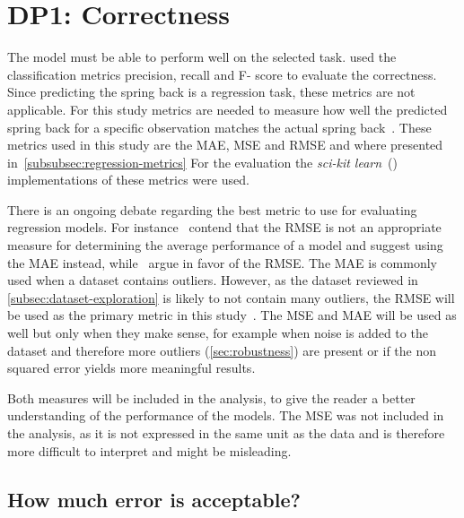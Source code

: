 \section{DP1: Correctness}\label{sec:dp1:-correctness}

The model must be able to perform well on the selected task.
\cite{siebert2022construction} used the classification metrics precision, recall and F- score to evaluate the
correctness.
Since predicting the spring back is a regression task, these metrics are not applicable.
For this study metrics are needed to measure how well the predicted spring back for a specific observation
matches the actual spring back~\cite[p. 29]{hastie2009elements}.
These metrics used in this study are the MAE, MSE and RMSE and where presented in~\cref{subsubsec:regression-metrics}
For the evaluation the \textit{sci-kit learn}~(\cite{scikit-learn}) implementations of these metrics were used.

There is an ongoing debate regarding the best metric to use for evaluating regression models.
For instance~\cite{willmott2005advantages} contend that the RMSE is not an appropriate measure for determining the
average performance of a model and suggest using the MAE instead, while~\cite{chai2014root} argue in favor of the RMSE.
The MAE is commonly used when a dataset contains outliers.
However, as the dataset reviewed in \cref{subsec:dataset-exploration} is likely to not contain many outliers, the
RMSE will be used as the primary metric in this study~\cite[p. 1249]{chai2014root}.
The MSE and MAE will be used as well but only when they make sense, for example when noise is added to the dataset
and therefore more outliers (\cref{sec:robustness}) are present or if the non squared error yields more meaningful
results.

Both measures will be included in the analysis, to give the reader a better understanding of the performance of
the models.
The MSE was not included in the analysis, as it is not expressed in the same unit as the data and is therefore
more difficult to interpret and might be misleading.

\subsection*{How much error is acceptable?}

